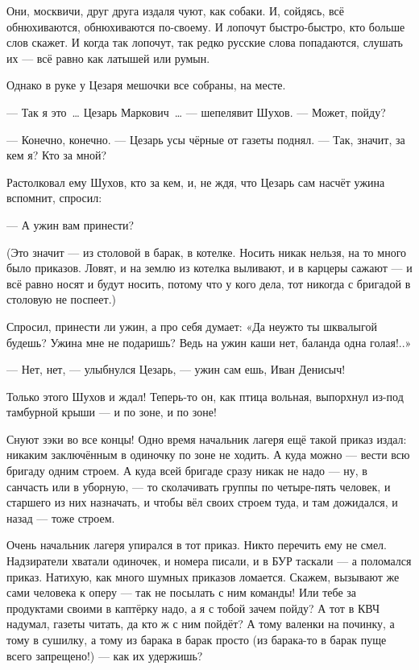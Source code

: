 Они, москвичи, друг друга издаля чуют, как собаки. И, сойдясь, всё обнюхиваются, обнюхиваются 
по-своему. И лопочут быстро-быстро, кто больше слов скажет. И когда так лопочут, так редко 
русские слова попадаются, слушать их --- всё равно как латышей или румын.

Однако в руке у Цезаря мешочки все собраны, на месте.

--- Так я это~\dots{} Цезарь Маркович~\dots{} --- шепелявит Шухов. --- Может, пойду?

--- Конечно, конечно. --- Цезарь усы чёрные от газеты поднял. --- Так, значит, за кем я? Кто за мной?

Растолковал ему Шухов, кто за кем, и, не ждя, что Цезарь сам насчёт ужина вспомнит, спросил:

--- А ужин вам принести?

(Это значит --- из столовой в барак, в котелке. Носить никак нельзя, на то много было приказов. 
Ловят, и на землю из котелка выливают, и в карцеры сажают --- и всё равно носят и будут носить, 
потому что у кого дела, тот никогда с бригадой в столовую не поспеет.)

Спросил, принести ли ужин, а про себя думает: «Да неужто ты шквалыгой будешь? Ужина мне не 
подаришь? Ведь на ужин каши нет, баланда одна голая!..»

--- Нет, нет, --- улыбнулся Цезарь, --- ужин сам ешь, Иван Денисыч!

Только этого Шухов и ждал! Теперь-то он, как птица вольная, выпорхнул из-под тамбурной крыши 
--- и по зоне, и по зоне!

Снуют зэки во все концы! Одно время начальник лагеря ещё такой приказ издал: никаким 
заключённым в одиночку по зоне не ходить. А куда можно --- вести всю бригаду одним строем. А 
куда всей бригаде сразу никак не надо --- ну, в санчасть или в уборную, --- то сколачивать группы 
по четыре-пять человек, и старшего из них назначать, и чтобы вёл своих строем туда, и там 
дожидался, и назад --- тоже строем.

Очень начальник лагеря упирался в тот приказ. Никто перечить ему не смел. Надзиратели 
хватали одиночек, и номера писали, и в БУР таскали --- а поломался приказ. Натихую, как много 
шумных приказов ломается. Скажем, вызывают же сами человека к оперу --- так не посылать с ним 
команды! Или тебе за продуктами своими в каптёрку надо, а я с тобой зачем пойду? А тот в КВЧ 
надумал, газеты читать, да кто ж с ним пойдёт? А тому валенки на починку, а тому в сушилку, а 
тому из барака в барак просто (из барака-то в барак пуще всего запрещено!) --- как их удержишь?

